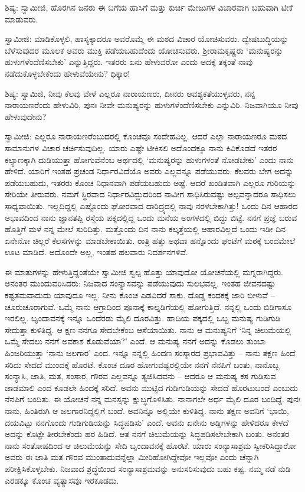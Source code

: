 ಶಿಷ್ಯ: ಸ್ವಾಮೀಜಿ, ಹೊರಗಿನ ಜನರು ಈ ಬಗೆಯ ಹಾಸಿಗೆ ಮತ್ತು ಕುರ್ಚಿ ಮೇಜುಗಳ ವಿಚಾರವಾಗಿ ಬಹುವಾಗಿ ಟೀಕೆ ಮಾಡುವರು.

ಸ್ವಾಮೀಜಿ: ಮಾಡಿಕೊಳ್ಳಲಿ, ಹಾಸ್ಯಕ್ಕಾದರೂ ಅವರೊಮ್ಮೆ ಈ ಮಠದ ವಿಚಾರ ಯೋಚಿಸುವರು. ದ್ವೇಷಬುದ್ಧಿಯನ್ನು ಬೆಳೆಸುವುದರ ಮೂಲಕ ಅವರು ಮುಕ್ತಿ ಪಡೆಯಬಹುದೆಂದು ಯೋಚಿಸುವರು. ಶ‍್ರೀರಾಮಕೃಷ್ಣರು ‘ಮನುಷ್ಯರನ್ನು ಹುಳುಗಳೆಂದೆಣಿಸಬೇಕು’ ಎನ್ನುತ್ತಿದ್ದರು. ಇತರರು ಏನು ಹೇಳುವರೋ ಎಂದು ಅದಕ್ಕೆ ತಕ್ಕಂತೆ ನಾವು ನಡೆದುಕೊಳ್ಳಬೇಕೆಂದು ಹೇಳುವೆಯೇನು? ಧಿಕ್ಕಾರ!

ಶಿಷ್ಯ: ಸ್ವಾಮಿಜಿ, ನೀವು ಕೆಲವು ವೇಳೆ ಎಲ್ಲರೂ ನಾರಾಯಣರು, ದೀನರು ಆವಶ್ಯಕತೆಯುಳ್ಳವರು, ನನ್ನ ನಾರಾಯಣರೆಂದು ಹೇಳುವಿರಿ, ಪುನಃ ನೀವೇ ಮನುಷ್ಯರನ್ನು ಹುಳುಗಳೆಂದೆಣಿಸಬೇಕು ಎನ್ನುವಿರಿ. ನಿಜವಾಗಿಯೂ ನೀವು ಹೇಳುವುದೇನು?

ಸ್ವಾಮೀಜಿ: ಎಲ್ಲರೂ ನಾರಾಯಣರೆಂಬುದರಲ್ಲಿ ಕೊಂಚವೂ ಸಂದೇಹವಿಲ್ಲ. ಆದರೆ ಎಲ್ಲಾ ನಾರಾಯಣರೂ ಮಠದ ಸಾಮಾನುಗಳ ವಿಚಾರ ಚರ್ಚಿಸುವುದಿಲ್ಲ. ಯಾರು ಎಷ್ಟೇ ಟೀಕಿಸಲಿ ಅದೊಂದಕ್ಕೂ ನಾನು ಕಿವಿಕೊಡದೆ ಇತರರ ಕಲ್ಯಾಣಕ್ಕಾಗಿ ದುಡಿಯುತ್ತಾ ಹೋಗುವೆನೆಂಬ ಅರ್ಥದಲ್ಲಿ ‘ಮನುಷ್ಯರನ್ನು ಹುಳುಗಳಂತೆ ನೋಡಬೇಕು’ ಎಂದು ನಾನು ಹೇಳಿದೆ. ಯಾರಿಗೆ ಇಂತಹ ಪ್ರಚಂಡ ನಿರ್ಧಾರವಿದೆಯೊ ಅವರು ಎಲ್ಲವನ್ನೂ ಪಡೆಯುವರು. ಕೆಲವರು ಬೇಗ ಅದನ್ನು ಪಡೆಯಬಹುದು, ಇತರರು ಕೊಂಚ ನಿಧಾನವಾಗಿ ಪಡೆಯಬಹುದು ಅಷ್ಟೆ. ಆದರೆ ಖಂಡಿತವಾಗಿ ಎಲ್ಲರೂ ಗುರಿಯನ್ನು ಸೇರಿಯೇ ತೀರುವರು. ನಮಗೆ ಸ್ಥಿರವಾದ ನಿರ್ಧಾರವಿದ್ದುದರಿಂದ ನಾವೀಗ ಸಾಧಿಸಿರುವಷ್ಟು ಅಲ್ಪವನ್ನಾದರೂ ಸಾಧಿಸಲು ಸಾಧ್ಯವಾಯಿತು. ಇಲ್ಲದಿದ್ದಲ್ಲಿ ಎಷ್ಟೊಂದು ಘೋರವಾದ ದಾರಿದ್ರ್ಯದಲ್ಲಿ ನಾವು ನರಳಬೇಕಾಗಿತ್ತು! ಒಂದು ದಿನ ಆಹಾರದ ಅಭಾವದಿಂದ ನಾನು ಜ್ಞಾನತಪ್ಪಿ ರಸ್ತೆಯ ಪಕ್ಕದಲ್ಲಿದ್ದ ಒಂದು ಮನೆಯ ಅಂಗಳದಲ್ಲಿ ಬಿದ್ದು ಬಿಟ್ಟೆ. ನನಗೆ ಪ್ರಜ್ಞೆ ಬರುವ ಹೊತ್ತಿಗೆ ಮಳೆ ನನ್ನ ಮೇಲೆ ಸುರಿದಿತ್ತು. ಮತ್ತೊಂದು ದಿನ ನಾನು ಕಲ್ಕತ್ತೆಯಲ್ಲಿ ಆಹಾರವಿಲ್ಲದೆ ಒಂದು ಇಡೀ ದಿನ ಏನೇನೋ ಚಿಲ್ಲರೆ ಕೆಲಸಗಳನ್ನು ಮಾಡಬೇಕಾಯಿತು. ರಾತ್ರಿ ಹತ್ತು ಅಥವಾ ಹನ್ನೊಂದು ಘಂಟೆಗೆ ಮಠಕ್ಕೆ ಬಂದಮೇಲೆ ಊಟ ಮಾಡಿದೆ. ಅದೊಂದೇ ಅಲ್ಲ, ಇಂತಹ ಹಲವಾರು ನಿದರ್ಶನಗಳಿವೆ.

ಈ ಮಾತುಗಳನ್ನು ಹೇಳುತ್ತಿದ್ದಂತೆಯೇ ಸ್ವಾಮೀಜಿ ಸ್ವಲ್ಪ ಹೊತ್ತು ಯಾವುದೋ ಯೋಚನೆಯಲ್ಲಿ ಮಗ್ನರಾಗಿದ್ದರು. ಅನಂತರ ಮುಂದುವರಿಸಿದರು: ನಿಜವಾದ ಸಂನ್ಯಾಸವನ್ನು ಪಡೆಯುವುದು ಸುಲಭವಲ್ಲ. ಇಂತಹ ಜೀವನದಷ್ಟು ಕಷ್ಟತಮವಾದುದು ಯಾವುದೂ ಇಲ್ಲ. ನೀನು ಕೊಂಚ ಎಡವಿದರೆ ಸಾಕು. ದೊಡ್ಡ ಕಂದಕಕ್ಕೆ ಜಾರಿ ಬೀಳುವೆ – ಚೂರುಚೂರಾಗುವೆ. ಒಮ್ಮೆ ನಾನು ಆಗ್ರಾದಿಂದ ಪೂನಾಕ್ಕೆ ಕಾಲ್ನಡಿಗೆಯಲ್ಲಿ ಹೋಗುತ್ತಿದೆ. ನನ್ನಲ್ಲಿ ಒಂದು ಬಿಡಿಗಾಸೂ ಇರಲಿಲ್ಲ. ಬೃಂದಾವನಕ್ಕೆ ಇನ್ನೂ ಒಂದೆರಡು ಮೈಲಿ ದೂರವಿತ್ತು. ಹಾದಿಯ ಪಕ್ಕದಲ್ಲಿ ಒಬ್ಬ ಮನುಷ್ಯ ಗುಡಿಗುಡಿ ಸೇದುತ್ತಾ ಕುಳಿತಿದ್ದ. ಆ ಕ್ಷಣ ನನಗೂ ಸೇದಬೇಕೆಂಬ ಆಸೆಯಾಯಿತು. ನಾನು ಆ ಮನುಷ್ಯನಿಗೆ ‘ನಿನ್ನ ಚಿಲುಮೆಯಲ್ಲಿ ಒಮ್ಮೆ ಸೇದಲು ನನಗೆ ಅವಕಾಶ ಕೊಡುವೆಯಾ?’ ಎಂದೆ. ಆ ಮನುಷ್ಯ ನನಗೆ ಅದನ್ನು ಕೊಡಲು ತುಂಬಾ ಹಿಂಜರಿಯುತ್ತಾ ‘ನಾನು ಜಲಗಾರ’ ಎಂದ. ಇನ್ನೂ ನನ್ನಲ್ಲಿ ಹಿಂದಣ ಸಂಸ್ಕಾರದ ಪ್ರಭಾವವಿತ್ತು – ನಾನು ತಕ್ಷಣ ಹಿಂದೆ ಸರಿದು ಸೇದದೆ ಮುಂದಕ್ಕೆ ಹೊರಟೆ. ಕೊಂಚ ದೂರ ಹೋಗುವಷ್ಟರಲ್ಲಿಯೇ ನನಗೆ ನೆನಪಿಗೆ ಬಂತು, ನಾನೊಬ್ಬ ಸಂನ್ಯಾಸಿ, ಜಾತಿ, ಮತ, ಸಂಸಾರ, ಗೌರವ ಎಲ್ಲವನ್ನೂ ತ್ಯಜಿಸಿದವನು – ಆದರೂ ಆ ಮನುಷ್ಯ ಕಸ ಗುಡಿಸುವ ಜಾಡಮಾಲಿ ಎಂದ ಕೂಡಲೇ ಹಿಂದಕ್ಕೆ ಸರಿದೆ. ಅವನು ಮುಟ್ಟಿದ ಗುಡಿಗುಡಿಯನ್ನು ಸೇದದೆ ಹೊರಟುಬಂದೆ ಎಂಬುದು ನೆನಪಿಗೆ ಬಂದಿತು. ಈ ಯೋಚನೆ ನನ್ನ ಮನಸ್ಸನ್ನು ಕ್ಷುಬ್ಧಗೊಳಿಸಿತು. ನಾನಾಗಲೇ ಅರ್ಧ ಮೈಲಿ ದೂರ ಬಂದಿದ್ದೆ. ಪುನಃ ನಾನು, ಹಿಂತಿರುಗಿ ಆ ಜಲಗಾರನಿದ್ದಲ್ಲಿಗೆ ಬಂದೆ. ಅವನಿನ್ನೂ ಅಲ್ಲಿಯೇ ಕುಳಿತಿದ್ದ. ನಾನು ತಕ್ಷಣ ಅವನಿಗೆ ‘ಭಾಯಿ, ದಯವಿಟ್ಟು ನನಗೊಂದು ಗುಡಿಗುಡಿಯನ್ನು ಸಿದ್ಧಪಡಿಸು’ ಎಂದೆ. ಅವನು ಏನೇನು ಅಡ್ಡಿಗಳನ್ನು ಹೇಳಿದರೂ ಕೇಳದೆ ಅದನ್ನು ಕೊಟ್ಟೇ ತೀರಬೇಕೆಂದು ಹಠ ಹಿಡಿದೆ. ಆತ ನನಗೆ ಚಿಲುಮೆಯನ್ನು ಸಿದ್ಧಪಡಿಸಲೇಬೇಕಾಗಿ ಬಂತು. ಅನಂತರ ನಾನು ಸಂತೋಷದಿಂದ ಆ ಚಿಲುಮೆಯನ್ನು ಸೇದಿ ಬೃಂದಾವನಕ್ಕೆ ಹೊರಟೆ. ಯಾರು ಸಂನ್ಯಾಸಾಶ್ರಮ ಸ್ವೀಕರಿಸಿದ್ದಾರೋ ಅವರು ಈ ಜಾತಿ ಮತ ಗೌರವ ಮುಂತಾದುವನ್ನೆಲ್ಲಾ ಮೀರಿಹೋಗಿದ್ದೇವೋ ಇಲ್ಲವೋ ಎಂದು ಚೆನ್ನಾಗಿ ಪರೀಕ್ಷಿಸಿಕೊಳ್ಳಬೇಕು. ನಿಜವಾದ ಶ್ರದ್ಧೆಯಿಂದ ಸಂನ್ಯಾಸಾಶ್ರಮವನ್ನು ಅನುಸರಿಸುವುದು ಬಹು ಕಷ್ಟ. ನಮ್ಮ ನಡೆ ನುಡಿ ಎರಡಕ್ಕೂ ಕೊಂಚ ವ್ಯತ್ಯಾಸವೂ ಇರಕೂಡದು.

